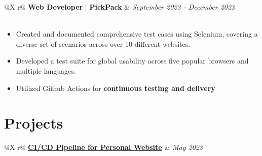 \documentclass[a4paper,12pt]{article}
\begin{document}
\begin{tabularx}{\linewidth}{ @{}X r@{} }
    {\textbf{Web Developer}} $\vert$ {\textbf{PickPack}} & \textit{September 2023 - December 2023} \\
     \\
\end{tabularx}
\begin{itemize}[nosep,leftmargin=*]
    \item Created and documented comprehensive test cases using Selenium, covering a diverse set of scenarios across over 10 different websites.
    \item Developed a test suite for global usability across five popular browsers and multiple languages.
    \item Utilized Github Actions for\textbf{ continuous testing and delivery}
\end{itemize}





\section{Projects}

\begin{tabularx}{\linewidth}{ @{}X r@{} }
    \href{https://ishan-next-react-website.vercel.app/}{\textbf{CI/CD Pipeline for Personal Website}} & \textit{May 2023} \\
     \\
\end{tabularx} 
\end{document}
